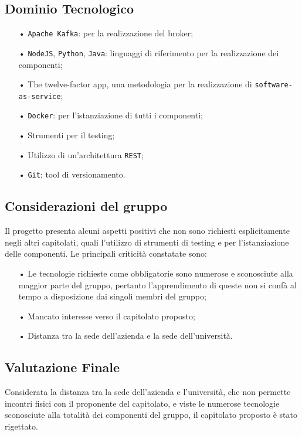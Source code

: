\subsection{Dominio Tecnologico}
\begin{itemize}
\item[•] \texttt{Apache Kafka}: per la realizzazione del broker;
\item[•] \texttt{NodeJS}, \texttt{Python}, \texttt{Java}: linguaggi di riferimento per la realizzazione dei componenti;
\item[•] The twelve-factor app, una metodologia per la realizzazione di \texttt{software-as-service};
\item[•] \texttt{Docker}: per l’istanziazione di
tutti i componenti;
\item[•] Strumenti per il testing;
\item[•] Utilizzo di un'architettura \texttt{REST};
\item[•] \texttt{Git}: tool di versionamento.

\end{itemize}
\subsection{Considerazioni del gruppo}

Il progetto presenta alcuni aspetti positivi che non sono richiesti esplicitamente negli altri capitolati, quali l'utilizzo di strumenti di testing e per l'istanziazione delle componenti. 
Le principali criticità constatate sono:
\begin{itemize}
\item[•] Le tecnologie richieste come obbligatorie sono numerose e sconosciute alla maggior parte del gruppo, pertanto l'apprendimento di queste non si confà al tempo a disposizione dai singoli membri del gruppo; 
\item[•] Mancato interesse verso il capitolato proposto;
\item[•] Distanza tra la sede dell'azienda e la sede dell'università.
\end{itemize}

\subsection{Valutazione Finale}
Considerata la distanza tra la sede dell'azienda e l'università, che non permette incontri fisici con il proponente del capitolato, e viste le numerose tecnologie sconosciute alla totalità dei componenti del gruppo, il capitolato proposto è stato rigettato.

